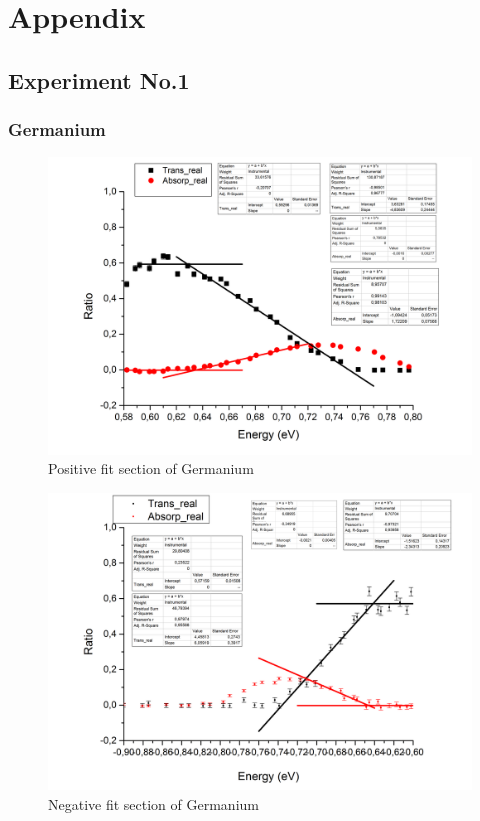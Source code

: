 \chapter{Appendix}
\section*{Experiment No.1}
\subsection*{Germanium}
\begin{figure}[h]
\begin{center}
\includegraphics[scale=0.25]{Bilder/Teil1/V1_Ge_positiv}
\caption{Positive fit section of Germanium}
\label{fig:GePo}
\end{center}
\end{figure}
\begin{figure}[h]
\begin{center}
\includegraphics[scale=0.25]{Bilder/Teil1/V1_Ge_negativ}
\caption{Negative fit section of Germanium}
\label{fig:GePo}
\end{center}
\end{figure}
